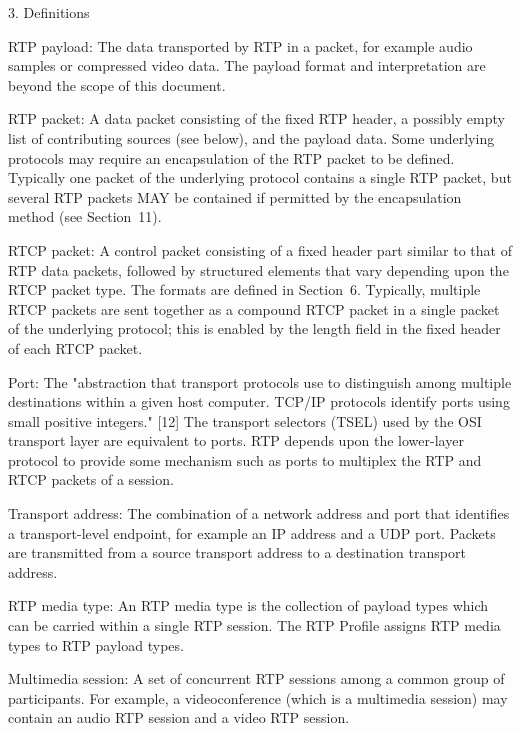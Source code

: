 \documentclass{article}
\begin{document}
3. Definitions

RTP payload: The data transported by RTP in a packet, for example audio samples or compressed video data.  The payload format and interpretation are beyond the scope of this document.

RTP packet: A data packet consisting of the fixed RTP header, a possibly empty list of contributing sources (see below), and the payload data.  Some underlying protocols may require an encapsulation of the RTP packet to be defined.  Typically one packet of the underlying protocol contains a single RTP packet, but several RTP packets MAY be contained if permitted by the encapsulation method (see Section~11).

RTCP packet: A control packet consisting of a fixed header part similar to that of RTP data packets, followed by structured elements that vary depending upon the RTCP packet type.  The formats are defined in Section~6.  Typically, multiple RTCP packets are sent together as a compound RTCP packet in a single packet of the underlying protocol; this is enabled by the length field in the fixed header of each RTCP packet.

Port: The "abstraction that transport protocols use to distinguish among multiple destinations within a given host computer.  TCP/IP protocols identify ports using small positive integers." [12] The transport selectors (TSEL) used by the OSI transport layer are equivalent to ports.  RTP depends upon the lower-layer protocol to provide some mechanism such as ports to multiplex the RTP and RTCP packets of a session.

Transport address: The combination of a network address and port that identifies a transport-level endpoint, for example an IP address and a UDP port.  Packets are transmitted from a source transport address to a destination transport address.

RTP media type: An RTP media type is the collection of payload types which can be carried within a single RTP session.  The RTP Profile assigns RTP media types to RTP payload types.

Multimedia session: A set of concurrent RTP sessions among a common group of participants.  For example, a videoconference (which is a multimedia session) may contain an audio RTP session and a video RTP session.
\end{document}
